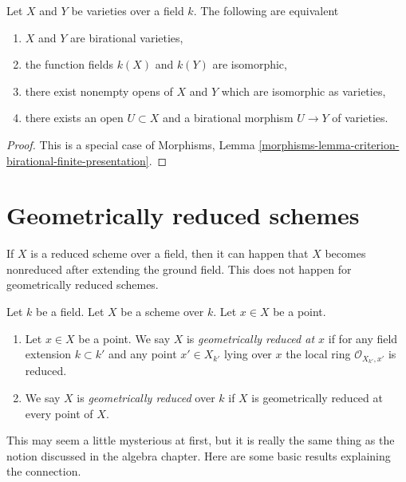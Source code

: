 \begin{lemma}
\label{lemma-birational-varieties}
Let $X$ and $Y$ be varieties over a field $k$.
The following are equivalent
\begin{enumerate}
\item $X$ and $Y$ are birational varieties,
\item the function fields $k(X)$ and $k(Y)$ are isomorphic,
\item there exist nonempty opens of $X$ and $Y$ which are isomorphic
as varieties,
\item there exists an open $U \subset X$ and a birational morphism
$U \to Y$ of varieties.
\end{enumerate}
\end{lemma}

\begin{proof}
This is a special case of
Morphisms, Lemma \ref{morphisms-lemma-criterion-birational-finite-presentation}.
\end{proof}








\section{Geometrically reduced schemes}
\label{section-geometrically-reduced}

\noindent
If $X$ is a reduced scheme over a field, then it can happen that $X$
becomes nonreduced after extending the ground field. This does not happen
for geometrically reduced schemes.

\begin{definition}
\label{definition-geometrically-reduced}
Let $k$ be a field.
Let $X$ be a scheme over $k$.
Let $x \in X$ be a point.
\begin{enumerate}
\item Let $x \in X$ be a point.
We say $X$ is {\it geometrically reduced at $x$}
if for any field extension $k \subset k'$
and any point $x' \in X_{k'}$ lying over $x$
the local ring $\mathcal{O}_{X_{k'}, x'}$ is reduced.
\item We say $X$ is {\it geometrically reduced} over $k$
if $X$ is geometrically reduced at every point of $X$.
\end{enumerate}
\end{definition}

\noindent
This may seem a little mysterious at first, but it is
really the same thing as the notion discussed in the algebra chapter.
Here are some basic results explaining the connection.

